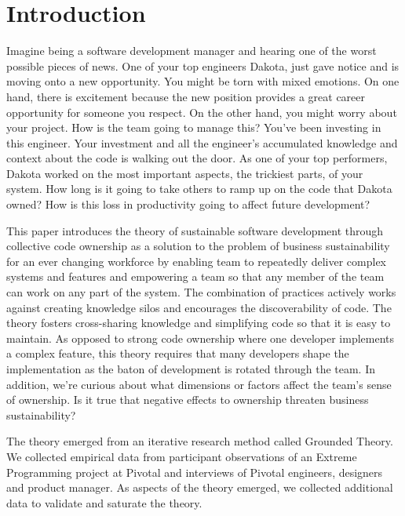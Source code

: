 \section{Introduction}

Imagine being a software development manager and hearing one of the worst possible pieces of news.  One of your top engineers Dakota, just gave notice and is moving onto a new opportunity. You might be torn with mixed emotions. On one hand, there is excitement because the new position provides a great career opportunity for someone you respect. On the other hand, you might worry about your project. How is the team going to manage this? You've been investing in this engineer. Your investment and all the engineer's accumulated knowledge and context about the code is walking out the door.  As one of your top performers, Dakota worked on the most important aspects, the trickiest parts, of your system. How long is it going to take others to ramp up on the code that Dakota owned? How is this loss in productivity going to affect future development? 



This paper introduces the theory of sustainable software development through collective code ownership as a solution to the problem of business sustainability for an ever changing workforce by enabling team to repeatedly deliver complex systems and features and empowering a team so that any member of the team can work on any part of the system. The combination of practices actively works against creating knowledge silos and encourages the discoverability of code. The theory fosters cross-sharing knowledge and simplifying code so that it is easy to maintain. As opposed to strong code ownership where one developer implements a complex feature, this theory requires that many developers shape the implementation as the baton of development is rotated through the team. In addition, we're curious about what dimensions or factors affect the team's sense of ownership. Is it true that negative effects to ownership threaten business sustainability?

The theory emerged from an iterative research method called Grounded Theory. We collected empirical data from participant observations of an Extreme Programming project at Pivotal and interviews of Pivotal engineers, designers and product manager. As aspects of the theory emerged, we collected additional data to validate and saturate the theory.

